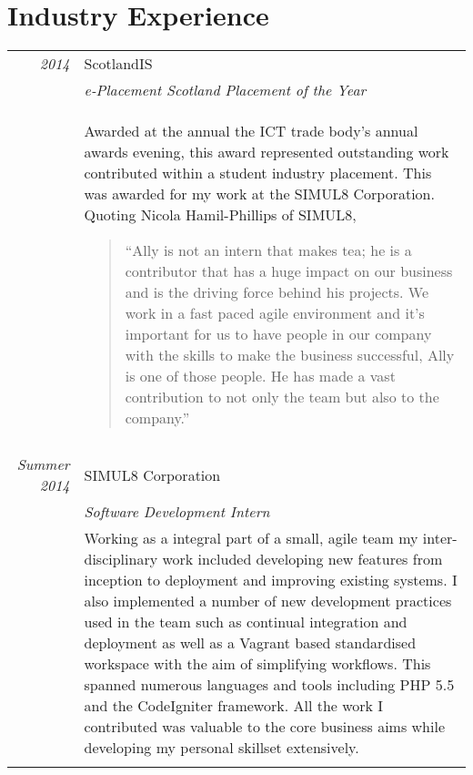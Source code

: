 \documentclass[a4paper,10pt]{article}
\begin{document}
\section{Industry Experience}
\begin{longtable}{r|p{11cm}}
\emph{2014} & ScotlandIS \\&\emph{e-Placement Scotland Placement of the Year}\\&\footnotesize{Awarded at the annual the ICT trade body's annual awards evening, this award represented outstanding work contributed within a student industry placement. This was awarded for my work at the SIMUL8 Corporation. Quoting Nicola Hamil-Phillips of SIMUL8,  \begin{quote}
“Ally is not an intern that makes tea; he is a contributor that has a huge impact on our business and is the driving force behind his projects. We work in a fast paced agile environment and it’s important for us to have people in our company with the skills to make the business successful, Ally is one of those people. He has made a vast contribution to not only the team but also to the company.”
\end{quote}

}\\\multicolumn{2}{c}{}\\
\emph {Summer 2014} & SIMUL8 Corporation \\&\emph{Software Development Intern}\\&\footnotesize{Working as a integral part of a small, agile team my inter-disciplinary work included developing new features from inception to deployment and improving existing systems. I also implemented a number of new development practices used in the team such as continual integration and deployment as well as a Vagrant based standardised workspace with the aim of simplifying workflows. This spanned numerous languages and tools including PHP 5.5 and the CodeIgniter framework. All the work I contributed was valuable to the core business aims while developing my personal skillset extensively.}\\\multicolumn{2}{c}{}\\
\end{longtable}

\clearpage

\end{document}
